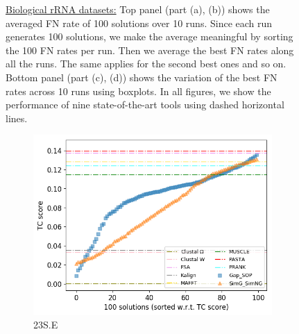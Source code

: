 \begin{figure}[!htbp]
\begin{adjustwidth}{-0.2cm}{}
\begin{subfigure}{0.5\columnwidth}
		\end{subfigure}
	\end{adjustwidth}
	\caption{\underline{Biological rRNA datasets:} Top panel (part (a), (b)) shows the averaged FN rate of 100 solutions over 10 runs. Since each run generates 100 solutions, we make the average meaningful by sorting the 100 FN rates per run. Then we average the best FN rates along all the runs. The same applies for the second best ones and so on. Bottom panel (part (c), (d)) shows the variation of the best FN rates across 10 runs using boxplots. In all figures, we show the performance of nine state-of-the-art tools using dashed horizontal lines.}
	\label{fig:fn_rate_bio}
\end{figure}

\begin{figure}[!htbp]
	\centering
	\begin{adjustwidth}{-0.2cm}{}
		\begin{subfigure}{0.5\columnwidth}
			\includegraphics[width=\columnwidth]{Figure/summary/precomputedInit/23S.E/tc_density_single_run}
			\caption{23S.E}
		\end{subfigure}	
		\begin{subfigure}{0.5\columnwidth}

\end{subfigure}
\end{adjustwidth}
\end{figure}
